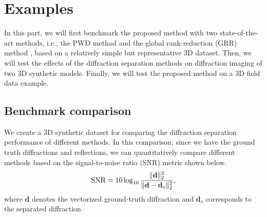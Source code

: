 %
%
%



\section{Examples}
In this part, we will first benchmark the proposed method with two state-of-the-art methods, i.e., the PWD method \cite[]{2007Post} and the global rank-reduction (GRR) method \cite[]{2020Diffraction}, based on a relatively simple but representative 3D dataset. Then, we will test the effects of the diffraction separation methods on diffraction imaging of two 3D synthetic models. Finally, we will test the proposed method on a 3D field data example. 

\subsection{Benchmark comparison}
We create a 3D synthetic dataset for comparing the diffraction separation performance of different methods. In this comparison, since we have the ground truth diffractions and reflections, we can quantitatively compare different methods based on the signal-to-noise ratio (SNR) metric shown below.
\begin{equation}
\label{eq:snr}
\text{SNR}=10\log_{10}\frac{\Arrowvert \mathbf{d} \Arrowvert_2^2}{\Arrowvert \mathbf{d} -\mathbf{d}_s\Arrowvert_2^2},
\end{equation}
where $\mathbf{d}$ denotes the vectorized ground-truth diffraction and $\mathbf{d}_s$ corresponds to the separated diffraction.  

